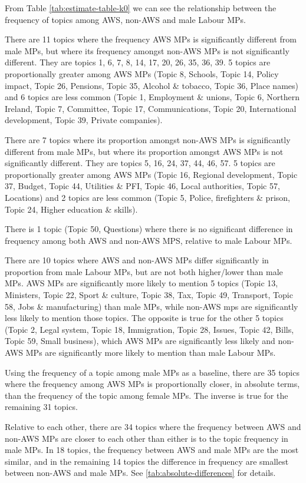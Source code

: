 \documentclass[]{article}
\theoremstyle{definition}
\theoremstyle{definition}
\theoremstyle{definition}
\theoremstyle{remark}
\begin{document}
\begin{table}[H]
\begin{table}[H]
\begin{table}[H]
\begin{table}[H]
\begin{table}[H]
\begin{table}[H]
\begin{table}[H]
\begin{table}[H]
From Table \ref{tab:estimate-table-k0} we can see the relationship
between the frequency of topics among AWS, non-AWS and male Labour MPs.

There are 11 topics where the frequency AWS MPs is significantly
different from male MPs, but where its frequency amongst non-AWS MPs is
not significantly different. They are topics 1, 6, 7, 8, 14, 17, 20, 26,
35, 36, 39. 5 topics are proportionally greater among AWS MPs (Topic 8,
Schools, Topic 14, Policy impact, Topic 26, Pensions, Topic 35, Alcohol
\& tobacco, Topic 36, Place names) and 6 topics are less common (Topic
1, Employment \& unions, Topic 6, Northern Ireland, Topic 7, Committee,
Topic 17, Communications, Topic 20, International development, Topic 39,
Private companies).

There are 7 topics where its proportion amongst non-AWS MPs is
significantly different from male MPs, but where its proportion amongst
AWS MPs is not significantly different. They are topics 5, 16, 24, 37,
44, 46, 57. 5 topics are proportionally greater among AWS MPs (Topic 16,
Regional development, Topic 37, Budget, Topic 44, Utilities \& PFI,
Topic 46, Local authorities, Topic 57, Locations) and 2 topics are less
common (Topic 5, Police, firefighters \& prison, Topic 24, Higher
education \& skills).

There is 1 topic (Topic 50, Questions) where there is no significant
difference in frequency among both AWS and non-AWS MPS, relative to male
Labour MPs.

There are 10 topics where AWS and non-AWS MPs differ significantly in
proportion from male Labour MPs, but are not both higher/lower than male
MPs. AWS MPs are significantly more likely to mention 5 topics (Topic
13, Ministers, Topic 22, Sport \& culture, Topic 38, Tax, Topic 49,
Transport, Topic 58, Jobs \& manufacturing) than male MPs, while non-AWS
mps are significantly less likely to mention those topics. The opposite
is true for the other 5 topics (Topic 2, Legal system, Topic 18,
Immigration, Topic 28, Issues, Topic 42, Bills, Topic 59, Small
business), which AWS MPs are significantly less likely and non-AWS MPs
are significantly more likely to mention than male Labour MPs.

Using the frequency of a topic among male MPs as a baseline, there are
35 topics where the frequency among AWS MPs is proportionally closer, in
absolute terms, than the frequency of the topic among female MPs. The
inverse is true for the remaining 31 topics.

Relative to each other, there are 34 topics where the frequency between
AWS and non-AWS MPs are closer to each other than either is to the topic
frequency in male MPs. In 18 topics, the frequency between AWS and male
MPs are the most similar, and in the remaining 14 topics the difference
in frequency are smallest between non-AWS and male MPs. See
\ref{tab:absolute-differences} for details.


\end{table}
\end{table}
\end{table}
\end{table}
\end{table}
\end{table}
\end{table}
\end{table}
\end{document}
